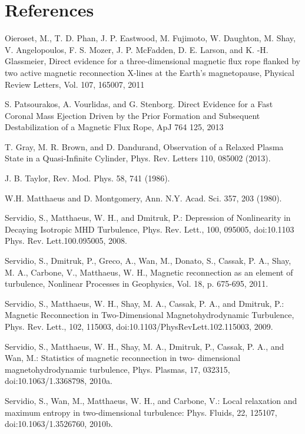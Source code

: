 \documentclass[12pt]{iopart}
\begin{document}
\section*{References}
\begin{thebibliography}{10}
Oieroset, M., T. D. Phan, J. P. Eastwood, M. Fujimoto, W. Daughton, M. Shay, V. Angelopoulos, F. S. Mozer, J. P. McFadden, D. E. Larson, and K. -H. Glassmeier, Direct evidence for a three-dimensional magnetic flux rope flanked by two active magnetic reconnection X-lines at the Earth's magnetopause, Physical Review Letters, Vol. 107, 165007, 2011

S. Patsourakos, A. Vourlidas, and G. Stenborg. Direct Evidence for a Fast Coronal Mass Ejection Driven by the Prior Formation and Subsequent Destabilization of a Magnetic Flux Rope,
ApJ 764 125, 2013

T. Gray, M. R. Brown, and D. Dandurand, Observation of a Relaxed Plasma State in a Quasi-Infinite Cylinder, Phys. Rev. Letters 110, 085002 (2013). 

 J. B. Taylor, Rev. Mod. Phys. 58, 741 (1986).

 W.H. Matthaeus and D. Montgomery, Ann. N.Y. Acad. Sci. 357, 203 (1980).

Servidio, S., Matthaeus, W. H., and Dmitruk, P.: Depression of Nonlinearity in Decaying Isotropic MHD Turbulence, Phys. Rev. Lett., 100, 095005, doi:10.1103 Phys. Rev. Lett.100.095005, 2008.

Servidio, S., Dmitruk, P., Greco, A., Wan, M., Donato, S., Cassak, P. A., Shay, M. A., Carbone, V., Matthaeus, W. H., Magnetic reconnection as an element of turbulence, Nonlinear Processes in Geophysics, Vol. 18, p. 675-695, 2011. 

Servidio, S., Matthaeus, W. H., Shay, M. A., Cassak, P. A., and Dmitruk, P.: Magnetic Reconnection in Two-Dimensional Magnetohydrodynamic Turbulence, Phys. Rev. Lett., 102, 115003, doi:10.1103/PhysRevLett.102.115003, 2009.

Servidio, S., Matthaeus, W. H., Shay, M. A., Dmitruk, P., Cassak, P. A., and Wan, M.: Statistics of magnetic reconnection in two- dimensional magnetohydrodynamic turbulence, Phys. Plasmas, 17, 032315, doi:10.1063/1.3368798, 2010a.

Servidio, S., Wan, M., Matthaeus, W. H., and Carbone, V.: Local relaxation and maximum entropy in two-dimensional turbulence: Phys. Fluids, 22, 125107, doi:10.1063/1.3526760, 2010b.


\end{thebibliography}
\end{document}
